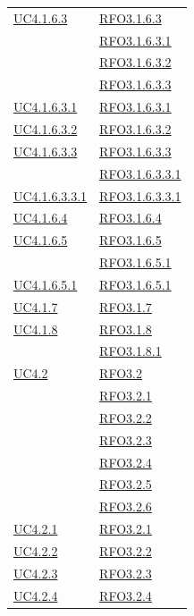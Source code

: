\begin{longtable}{|>{\centering}m{5cm}|m{5cm}<{\centering}|}
\hyperref[UC4.1.6.3]{UC4.1.6.3} & \hyperlink{RFO3.1.6.3}{RFO3.1.6.3}\\
& \hyperlink{RFO3.1.6.3.1}{RFO3.1.6.3.1}\\
& \hyperlink{RFO3.1.6.3.2}{RFO3.1.6.3.2}\\
& \hyperlink{RFO3.1.6.3.3}{RFO3.1.6.3.3}\\ \hline
\hyperref[UC4.1.6.3.1]{UC4.1.6.3.1} & \hyperlink{RFO3.1.6.3.1}{RFO3.1.6.3.1}\\ \hline
\hyperref[UC4.1.6.3.2]{UC4.1.6.3.2} & \hyperlink{RFO3.1.6.3.2}{RFO3.1.6.3.2}\\ \hline
\hyperref[UC4.1.6.3.3]{UC4.1.6.3.3} & \hyperlink{RFO3.1.6.3.3}{RFO3.1.6.3.3}\\
& \hyperlink{RFO3.1.6.3.3.1}{RFO3.1.6.3.3.1}\\ \hline
\hyperref[UC4.1.6.3.3.1]{UC4.1.6.3.3.1} & \hyperlink{RFO3.1.6.3.3.1}{RFO3.1.6.3.3.1}\\ \hline
\hyperref[UC4.1.6.4]{UC4.1.6.4} & \hyperlink{RFO3.1.6.4}{RFO3.1.6.4}\\ \hline
\hyperref[UC4.1.6.5]{UC4.1.6.5} & \hyperlink{RFO3.1.6.5}{RFO3.1.6.5}\\
& \hyperlink{RFO3.1.6.5.1}{RFO3.1.6.5.1}\\ \hline
\hyperref[UC4.1.6.5.1]{UC4.1.6.5.1} & \hyperlink{RFO3.1.6.5.1}{RFO3.1.6.5.1}\\ \hline
\hyperref[UC4.1.7]{UC4.1.7} & \hyperlink{RFO3.1.7}{RFO3.1.7}\\ \hline
\hyperref[UC4.1.8]{UC4.1.8} & \hyperlink{RFO3.1.8}{RFO3.1.8}\\
& \hyperlink{RFO3.1.8.1}{RFO3.1.8.1}\\ \hline
\hyperref[UC4.2]{UC4.2} & \hyperlink{RFO3.2}{RFO3.2}\\
& \hyperlink{RFO3.2.1}{RFO3.2.1}\\
& \hyperlink{RFO3.2.2}{RFO3.2.2}\\
& \hyperlink{RFO3.2.3}{RFO3.2.3}\\
& \hyperlink{RFO3.2.4}{RFO3.2.4}\\
& \hyperlink{RFO3.2.5}{RFO3.2.5}\\
& \hyperlink{RFO3.2.6}{RFO3.2.6}\\ \hline
\hyperref[UC4.2.1]{UC4.2.1} & \hyperlink{RFO3.2.1}{RFO3.2.1}\\ \hline
\hyperref[UC4.2.2]{UC4.2.2} & \hyperlink{RFO3.2.2}{RFO3.2.2}\\ \hline
\hyperref[UC4.2.3]{UC4.2.3} & \hyperlink{RFO3.2.3}{RFO3.2.3}\\ \hline
\hyperref[UC4.2.4]{UC4.2.4} & \hyperlink{RFO3.2.4}{RFO3.2.4}\\ \hline

\end{longtable}
